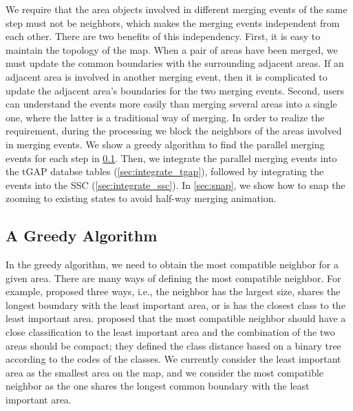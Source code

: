 \documentclass[ijgi,article,submit,moreauthors,pdftex]{Definitions/mdpi}
\begin{document}
We require that 
the area objects involved in different merging events of the same step 
must not be neighbors, 
which makes the merging events independent from each other.
There are two benefits of this independency.
First, it is easy to maintain the topology of the map.
When a pair of areas have been merged, 
we must update the common boundaries with the surrounding adjacent areas.
If an adjacent area is involved in another merging event,
then it is complicated to update the adjacent area's boundaries
for the two merging events.
Second, users can understand the events more easily 
than merging several areas into a single one,
where the latter is a traditional way of merging.
In order to realize the requirement, during the processing 
we block the neighbors of the areas involved in merging events.
We show a greedy algorithm to find the parallel merging events for each step
in \sect\ref{sec:greedy_algo}.
Then, we integrate the parallel merging events into the tGAP databse tables
(\sect\ref{sec:integrate_tgap}),
followed by integrating the events into the SSC 
(\sect\ref{sec:integrate_ssc}).
In \sect\ref{sec:snap}, we show how to snap the zooming to existing states
to avoid half-way merging animation.

\subsection{A Greedy Algorithm}
\label{sec:greedy_algo}

In the greedy algorithm, we need to obtain the most compatible neighbor 
for a given area.
There are many ways of defining the most compatible neighbor.
For example, \citet{Cheng2006} proposed three ways, i.e.,
the neighbor has the largest size, 
shares the longest boundary with the least important area,
or is has the closest class to the least important area. 
\citet{Peng2017AStar} proposed that 
the most compatible neighbor should have a close classification
to the least important area
and the combination of the two areas should be compact;
they defined the class distance based on a binary tree
according to the codes of the classes.
We currently consider the least important area 
as the smallest area on the map,
and we consider the most compatible neighbor
as the one shares the longest common boundary 
with the least important area.
\end{document}

